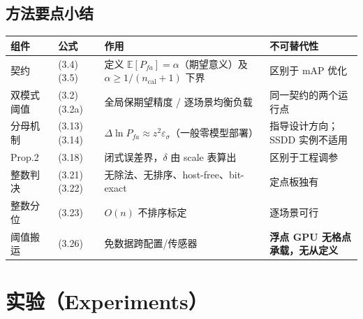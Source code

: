 \subsection{方法要点小结}\label{ux65b9ux6cd5ux8981ux70b9ux5c0fux7ed3}

{\def\LTcaptype{none} %
\begin{longtable}[]{@{}
  >{\raggedright\arraybackslash}p{}
  >{\raggedright\arraybackslash}p{}
  >{\raggedright\arraybackslash}p{}
  >{\raggedright\arraybackslash}p{}@{}}
\toprule\noalign{}
\begin{minipage}[b]{\linewidth}\raggedright
组件
\end{minipage} & \begin{minipage}[b]{\linewidth}\raggedright
公式
\end{minipage} & \begin{minipage}[b]{\linewidth}\raggedright
作用
\end{minipage} & \begin{minipage}[b]{\linewidth}\raggedright
不可替代性
\end{minipage} \\
\midrule\noalign{}
\endhead
\bottomrule\noalign{}
\endlastfoot
契约 & (3.4)(3.5) & 定义 \(\mathbb{E}[P_{fa}]=\alpha\)（期望意义）及
\(\alpha\ge1/(n_{\mathrm{cal}}+1)\) 下界 & 区别于 mAP 优化 \\
双模式阈值 & (3.2)(3.2a) & 全局保期望精度 / 逐场景均衡负载 &
同一契约的两个运行点 \\
分母机制 & (3.13)(3.14) &
\(\Delta\ln P_{fa}\approx z^2\varepsilon_\sigma\)（一般零模型部署） &
指导设计方向；SSDD 实例不适用 \\
Prop.2 & (3.18) & 闭式误差界，\(\delta\) 由 scale 表算出 &
区别于工程调参 \\
整数判决 & (3.21)(3.22) & 无除法、无排序、host-free、bit-exact &
定点板独有 \\
整数分位 & (3.23) & \(O(n)\) 不排序标定 & 逐场景可行 \\
阈值搬运 & (3.26) & 免数据跨配置/传感器 & \textbf{浮点 GPU
无格点承载，无从定义} \\
\end{longtable}
}

\section{实验（Experiments）}\label{ux5b9eux9a8cexperiments}

